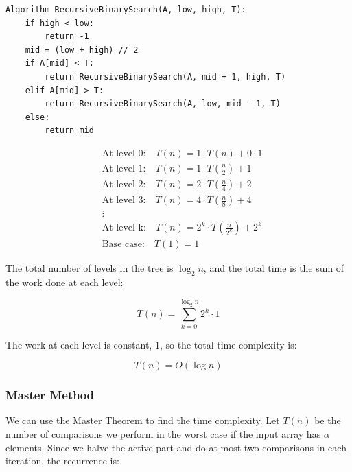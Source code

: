 \documentclass{article}
\begin{document}
\begin{verbatim}
Algorithm RecursiveBinarySearch(A, low, high, T):
    if high < low:
        return -1
    mid = (low + high) // 2
    if A[mid] < T:
        return RecursiveBinarySearch(A, mid + 1, high, T)
    elif A[mid] > T:
        return RecursiveBinarySearch(A, low, mid - 1, T)
    else:
        return mid
\end{verbatim}

\begin{center}

\[
\begin{aligned}
& \text{At level 0:} \quad T(n) = 1 \cdot T(n) + 0 \cdot 1 \\
& \text{At level 1:} \quad T(n) = 1 \cdot T\left(\frac{n}{2}\right) + 1 \\
& \text{At level 2:} \quad T(n) = 2 \cdot T\left(\frac{n}{4}\right) + 2 \\
& \text{At level 3:} \quad T(n) = 4 \cdot T\left(\frac{n}{8}\right) + 4 \\
& \vdots \\
& \text{At level k:} \quad T(n) = 2^k \cdot T\left(\frac{n}{2^k}\right) + 2^k \\
& \text{Base case:} \quad T(1) = 1
\end{aligned}
\]

The total number of levels in the tree is \( \log_2 n \), and the total time is the sum of the work done at each level:

\[
T(n) = \sum_{k=0}^{\log_2 n} 2^k \cdot 1
\]

The work at each level is constant, \( 1 \), so the total time complexity is:

\[
T(n) = O(\log n)
\]
\end{center}

\subsubsection{Master Method\cite{WinNT}}
We can use the Master Theorem to find the time complexity. Let $T(n)$ be the number of comparisons we perform in the worst case if the input array has $\alpha$ elements. Since we halve the active part and do at most two comparisons in each iteration, the recurrence is:
\end{document}
